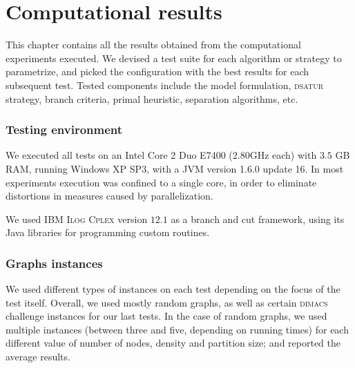 
\chapter{Computational results}
\label{sec:results}

This chapter contains all the results obtained from the computational experiments executed. We devised a test suite for each algorithm or strategy to parametrize, and picked the configuration with the best results for each subsequent test. Tested components include the model formulation, \textsc{dsatur} strategy, branch criteria, primal heuristic, separation algorithms, etc.

\subsection{Testing environment}

We executed all tests on an Intel Core 2 Duo E7400 ($2.80$GHz each) with $3.5$ GB RAM, running Windows XP SP3, with a JVM version 1.6.0 update 16. In most experiments execution was confined to a single core, in order to eliminate distortions in measures caused by parallelization.

We used \textsc{IBM Ilog Cplex} version $12.1$ as a branch and cut framework, using its Java libraries for programming custom routines.

\subsection{Graphs instances}

We used different types of instances on each test depending on the focus of the test itself. Overall, we used mostly random graphs, as well as certain \textsc{dimacs} challenge instances\cite{dimacs} for our last tests. In the case of random graphs, we used multiple instances (between three and five, depending on running times) for each different value of number of nodes, density and partition size; and reported the average results.

